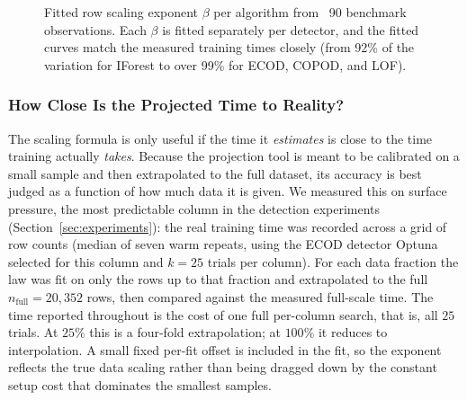 \documentclass[12pt]{article}
\begin{document}
\begin{figure}[H]
\begin{center}
\end{center}
\caption{Fitted row scaling exponent $\beta$ per algorithm from ~90 benchmark observations. Each $\beta$ is fitted separately per detector, and the fitted curves match the measured training times closely (from 92\% of the variation for IForest to over 99\% for ECOD, COPOD, and LOF).}
\label{fig:beta_chart}
\end{figure}

\subsubsection{How Close Is the Projected Time to Reality?}
\label{sec:projection_accuracy}

The scaling formula is only useful if the time it \emph{estimates} is close to the time training actually \emph{takes}. Because the projection tool is meant to be calibrated on a small sample and then extrapolated to the full dataset, its accuracy is best judged as a function of how much data it is given. We measured this on surface pressure, the most predictable column in the detection experiments (Section~\ref{sec:experiments}): the real training time was recorded across a grid of row counts (median of seven warm repeats, using the ECOD detector Optuna selected for this column and $k=25$ trials per column). For each data fraction the law was fit on only the rows up to that fraction and extrapolated to the full $n_{\text{full}}=20{,}352$ rows, then compared against the measured full-scale time. The time reported throughout is the cost of one full per-column search, that is, all $25$ trials. At $25\%$ this is a four-fold extrapolation; at $100\%$ it reduces to interpolation. A small fixed per-fit offset is included in the fit, so the exponent reflects the true data scaling rather than being dragged down by the constant setup cost that dominates the smallest samples.
\end{document}

